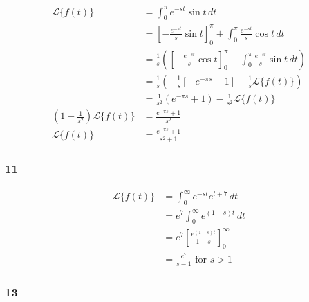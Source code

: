 \documentclass{article}
\begin{document}
\begin{align*}
  \mathcal{L}\{f(t)\}                                  & = \int_0^\pi e^{-s t} \sin t \,dt                                                                                        \\
                                                       & = \left[ -\frac{e^{-s t}}{s} \sin t \right]_0^\pi + \int_0^\pi \frac{e^{-s t}}{s} \cos t \,dt                            \\
                                                       & = \frac{1}{s} \left( \left[ -\frac{e^{-s t}}{s} \cos t \right]_0^\pi - \int_0^\pi \frac{e^{-s t}}{s} \sin t \,dt \right) \\
                                                       & = \frac{1}{s} \left( -\frac{1}{s} \left[ -e^{-\pi s} - 1 \right] - \frac{1}{s} \mathcal{L}\{f(t)\} \right)               \\
                                                       & = \frac{1}{s^2} (e^{-\pi s} + 1) - \frac{1}{s^2} \mathcal{L}\{f(t)\}                                                     \\
  \left( 1 + \frac{1}{s^2} \right) \mathcal{L}\{f(t)\} & = \frac{e^{-\pi s} + 1}{s^2}                                                                                             \\
  \mathcal{L}\{f(t)\}                                  & = \frac{e^{-\pi s} + 1}{s^2 + 1}
\end{align*}

\subsubsection{11}

\begin{align*}
  \mathcal{L}\{f(t)\} & = \int_0^\infty e^{-s t} e^{t + 7} \,dt                   \\
                      & = e^7 \int_0^\infty e^{(1 - s) t} \,dt                    \\
                      & = e^7 \left[ \frac{e^{(1 - s) t}}{1 - s} \right]_0^\infty \\
                      & = \frac{e^7}{s - 1} \text{ for } s > 1
\end{align*}

\subsubsection{13}
\end{document}

